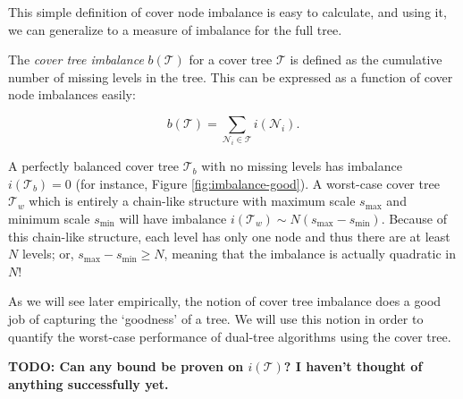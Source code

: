 This simple definition of cover node imbalance is easy to calculate, and using
it, we can generalize to a measure of imbalance for the full tree.

\begin{defn}
The {\it cover tree imbalance} $b(\mathscr{T})$ for a cover tree $\mathscr{T}$
is defined as the cumulative number of missing levels in the tree.  This can be
expressed as a function of cover node imbalances easily:

\begin{equation}
b(\mathscr{T}) = \sum_{\mathscr{N}_i \in \mathscr{T}} i(\mathscr{N}_i).
\end{equation}
\end{defn}

A perfectly balanced cover tree $\mathscr{T}_b$ with no missing levels has
imbalance $i(\mathscr{T}_b) = 0$ (for instance, Figure
\ref{fig:imbalance-good}).  A worst-case cover tree $\mathscr{T}_w$ which is
entirely a chain-like structure with maximum scale $s_{\max}$ and minimum scale
$s_{\min}$ will have imbalance $i(\mathscr{T}_w) \sim N (s_{\max} - s_{\min})$.
Because of this chain-like structure, each level has only one node and thus
there are at least $N$ levels; or, $s_{\max} - s_{\min} \ge N$, meaning that the
imbalance is actually quadratic in $N$!

As we will see later empirically, the notion of cover tree imbalance does a good
job of capturing the `goodness' of a tree.  We will use this notion in order to
quantify the worst-case performance of dual-tree algorithms using the cover
tree.

{\bf TODO: Can any bound be proven on $i(\mathscr{T})$?  I haven't thought of
anything successfully yet.}
